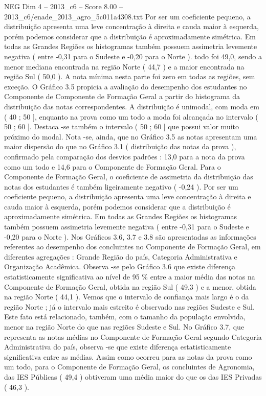 \begin{textsample}{NEG Dim 4 – 2013\_c6 – Score 8.00 – 2013\_c6/enade\_2013\_agro\_5c011a4308.txt}
Por ser um coeficiente pequeno, a distribuição apresenta uma leve concentração à direita e cauda maior à esquerda, porém podemos considerar que a distribuição é aproximadamente simétrica.
Em todas as Grandes Regiões os histogramas também possuem assimetria levemente negativa ( entre -0,31 para o Sudeste e -0,20 para o Norte ). todo foi 49,0, sendo a menor mediana encontrada na região Norte ( 44,7 ) e a maior encontrada na região Sul ( 50,0 ).
A nota mínima nesta parte foi zero em todas as regiões, sem exceção.
O Gráfico 3.5 propicia a avaliação do desempenho dos estudantes no Componente de Componente de Formação Geral a partir do histograma da distribuição das notas correspondentes.
A distribuição é unimodal, com moda em ( 40 ; 50 ], enquanto na prova como um todo a moda foi alcançada no intervalo ( 50 ; 60 ].
Destaca -se também o intervalo ( 50 ; 60 ] que possui valor muito próximo do modal.
Nota -se, ainda, que no Gráfico 3.5 as notas apresentam uma maior dispersão do que no Gráfico 3.1 ( distribuição das notas da prova ), confirmado pela comparação dos desvios padrões : 13,0 para a nota da prova como um todo e 14,6 para o Componente de Formação Geral.
Para o Componente de Formação Geral, o coeficiente de assimetria da distribuição das notas dos estudantes é também ligeiramente negativo ( -0,24 ).
Por ser um coeficiente pequeno, a distribuição apresenta uma leve concentração à direita e cauda maior à esquerda, porém podemos considerar que a distribuição é aproximadamente simétrica.
Em todas as Grandes Regiões os histogramas também possuem assimetria levemente negativa ( entre -0,31 para o Sudeste e -0,20 para o Norte ).
Nos Gráficos 3.6, 3.7 e 3.8 são apresentadas as informações referentes ao desempenho dos concluintes no Componente de Formação Geral, em diferentes agregações : Grande Região do país, Categoria Administrativa e Organização Acadêmica.
Observa -se pelo Gráfico 3.6 que existe diferença estatisticamente significativa ao nível de 95 \% entre a maior média das notas na Componente de Formação Geral, obtida na região Sul ( 49,3 ) e a menor, obtida na região Norte ( 44,1 ).
Vemos que o intervalo de confiança mais largo é o da região Norte ; já o intervalo mais estreito é observado nas regiões Sudeste e Sul.
Este fato está relacionado, também, com o tamanho da população envolvida, menor na região Norte do que nas regiões Sudeste e Sul.
No Gráfico 3.7, que representa as notas médias no Componente de Formação Geral segundo Categoria Administrativa do país, observa -se que existe diferença estatisticamente significativa entre as médias.
Assim como ocorreu para as notas da prova como um todo, para o Componente de Formação Geral, os concluintes de Agronomia, das IES Públicas ( 49,4 ) obtiveram uma média maior do que os das IES Privadas ( 46,3 ).

\end{textsample}

